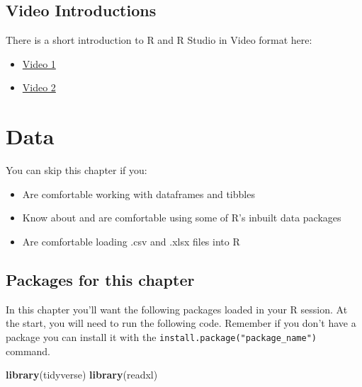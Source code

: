 \documentclass[
]{book}
\newenvironment{Shaded}{\begin{snugshade}}{\end{snugshade}}
\newcommand{\KeywordTok}[1]{\textcolor[rgb]{0.13,0.29,0.53}{\textbf{#1}}}
\newcommand{\NormalTok}[1]{#1}
\begin{document}
\hypertarget{video_env}{%
\section{Video Introductions}\label{video_env}}

There is a short introduction to R and R Studio in Video format here:

\begin{itemize}
\item
  \href{https://media.ed.ac.uk/media/R+ConversationsA+Intro+to+R+Studio+1/1_aox3in51/112983051}{Video 1}
\item
  \href{https://media.ed.ac.uk/media/R+ConversationsA+Intro+to+R+Studio+2/1_vm1bylon}{Video 2}
\end{itemize}

\hypertarget{data}{%
\chapter{Data}\label{data}}

\begin{los}
You can skip this chapter if you:

\begin{itemize}
\item
  Are comfortable working with dataframes and tibbles
\item
  Know about and are comfortable using some of R's inbuilt data packages
\item
  Are comfortable loading .csv and .xlsx files into R
\end{itemize}
\end{los}

\hypertarget{packages-for-this-chapter}{%
\section{Packages for this chapter}\label{packages-for-this-chapter}}

In this chapter you'll want the following packages loaded in your R session. At the start, you will need to run the following code. Remember if you don't have a package you can install it with the \texttt{install.package("package\_name")} command.

\begin{Shaded}
\begin{Highlighting}[]
\KeywordTok{library}\NormalTok{(tidyverse)}
\KeywordTok{library}\NormalTok{(readxl)}
\end{Highlighting}
\end{Shaded}
\end{document}
